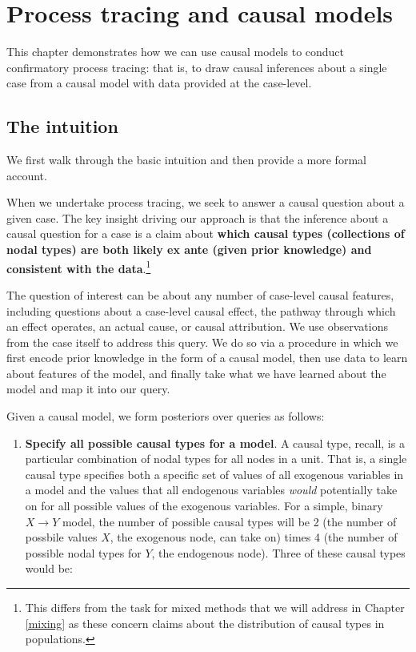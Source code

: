 \documentclass[
  12pt,
]{book}
\providecommand{\tightlist}{%
  \setlength{\itemsep}{0pt}\setlength{\parskip}{0pt}}
\begin{document}
\hypertarget{process-tracing-and-causal-models}{%
\section{Process tracing and causal models}\label{process-tracing-and-causal-models}}

This chapter demonstrates how we can use causal models to conduct confirmatory process tracing: that is, to draw causal inferences about a single case from a causal model with data provided at the case-level.

\hypertarget{the-intuition}{%
\subsection{The intuition}\label{the-intuition}}

We first walk through the basic intuition and then provide a more formal account.

When we undertake process tracing, we seek to answer a causal question about a given case.
The key insight driving our approach is that the inference about a causal question for a case is a claim about \textbf{which causal types (collections of nodal types) are both likely ex ante (given prior knowledge) and consistent with the data}.\footnote{This differs from the task for mixed methods that we will address in Chapter \ref{mixing} as these concern claims about the distribution of causal types in populations.}

The question of interest can be about any number of case-level causal features, including questions about a case-level causal effect, the pathway through which an effect operates, an actual cause, or causal attribution. We use observations from the case itself to address this query. We do so via a procedure in which we first encode prior knowledge in the form of a causal model, then use data to learn about features of the model, and finally take what we have learned about the model and map it into our query.

Given a causal model, we form posteriors over queries as follows:

\begin{enumerate}
\def\labelenumi{\arabic{enumi}.}
\tightlist
\item
  \textbf{Specify all possible causal types for a model}. A causal type, recall, is a particular combination of nodal types for all nodes in a unit. That is, a single causal type specifies both a specific set of values of all exogenous variables in a model and the values that all endogenous variables \emph{would} potentially take on for all possible values of the exogenous variables. For a simple, binary \(X \rightarrow Y\) model, the number of possible causal types will be 2 (the number of possbile values \(X\), the exogenous node, can take on) times 4 (the number of possible nodal types for \(Y\), the endogenous node). Three of these causal types would be:
\end{enumerate}
\end{document}
